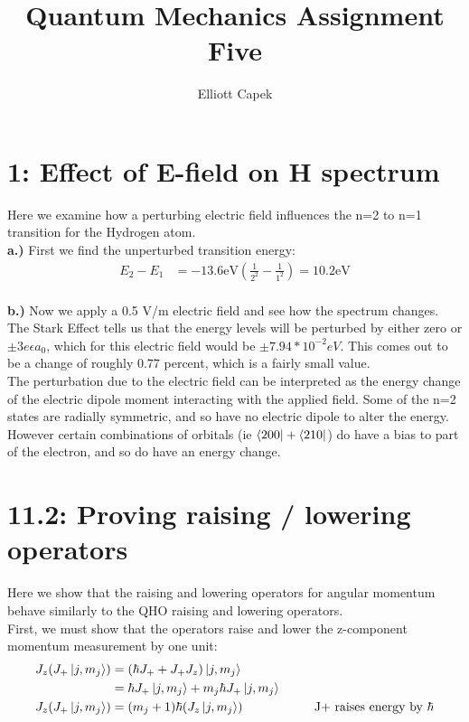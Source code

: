 \documentclass[10pt]{article} %
\title{Quantum Mechanics Assignment Five}
\author{Elliott Capek}
\begin{document}
\maketitle{}

\section{1: Effect of E-field on H spectrum}
Here we examine how a perturbing electric field influences the n=2 to n=1 transition for
the Hydrogen atom.\\

\textbf{a.)} First we find the unperturbed transition energy:\\

\begin{align*}
  E_2 - E_1 &= -13.6 \mbox{eV} \left(\frac{1}{2^2} - \frac{1}{1^2}\right) = 10.2 \mbox{eV}\\
\end{align*}

\textbf{b.)} Now we apply a 0.5 V/m electric field and see how the spectrum changes. The Stark
Effect tells us that the energy levels will be perturbed by either zero or
$\pm3e\epsilon a_0$, which for this electric field would be $\pm 7.94*10^{-2}eV$. This comes out
to be a change of roughly $0.77$ percent, which is a fairly small value.\\

The perturbation due to the electric field can be interpreted as the energy change of the
electric dipole moment interacting with the applied field. Some of the n=2 states are radially
symmetric, and so have no electric dipole to alter the energy. However certain combinations of
orbitals (ie $\bra{200}+\bra{210}$) do have a bias to part of the electron, and so do have an
energy change.\\

\section{11.2: Proving raising / lowering operators}
Here we show that the raising and lowering operators for angular momentum behave similarly
to the QHO raising and lowering operators.\\

First, we must show that the operators raise and lower the z-component momentum measurement
by one unit:\\

\begin{align*}
  J_z(J_+\ket{j,m_j}) &= (\hbar J_+ + J_+J_z)\ket{j,m_j}\\
  &= \hbar J_+\ket{j,m_j} + m_j \hbar J_+\ket{j,m_j}\\
  J_z(J_+\ket{j,m_j}) &= (m_j+1)\hbar(J_z\ket{j,m_j})
  \hspace{2cm}\mbox{J+ raises energy by $\hbar$}\\
\end{align*}
\end{document}
